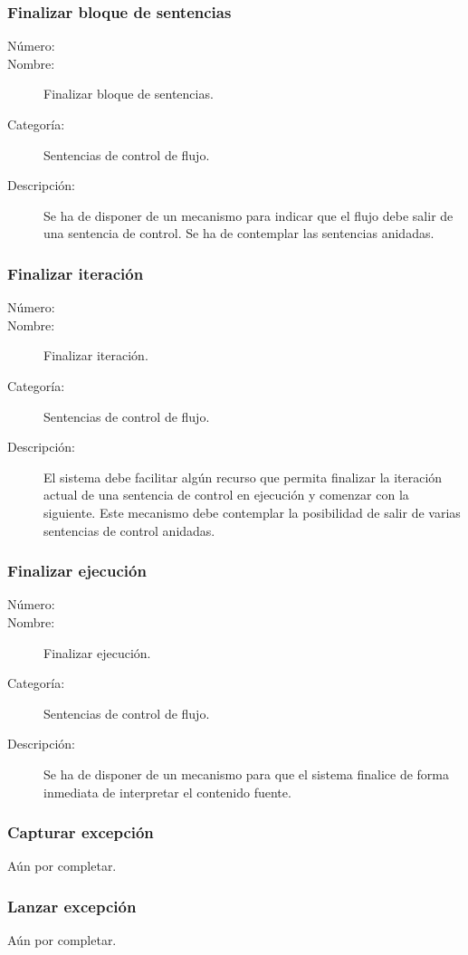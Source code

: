 \subsubsection{Finalizar bloque de sentencias}
\begin{framed}
	\begin{description}
		\item [Número:] \cn
		\item [Nombre:] Finalizar bloque de sentencias.
		\item [Categoría:] Sentencias de control de flujo.
		\item [Descripción:] Se ha de disponer de un mecanismo para indicar que el flujo debe salir de una sentencia de control. Se ha de contemplar
		las sentencias anidadas.
	\end {description}
\end{framed}



\subsubsection{Finalizar iteración}
\begin{framed}
	\begin{description}
		\item [Número:] \cn
		\item [Nombre:] Finalizar iteración.
		\item [Categoría:] Sentencias de control de flujo.
		\item [Descripción:] El sistema debe facilitar algún recurso que permita finalizar la iteración actual
		de una sentencia de control en ejecución y comenzar con la siguiente. Este
		mecanismo debe contemplar la posibilidad de salir de varias sentencias de control anidadas.
	\end {description}
\end{framed}

\subsubsection{Finalizar ejecución}
\begin{framed}
	\begin{description}
		\item [Número:] \cn
		\item [Nombre:] Finalizar ejecución.
		\item [Categoría:] Sentencias de control de flujo.
		\item [Descripción:] Se ha de disponer de un mecanismo para que el sistema finalice de forma inmediata de
		interpretar el contenido fuente.
	\end {description}
\end{framed}

\subsubsection{Capturar excepción}

Aún por completar.

\subsubsection{Lanzar excepción}

Aún por completar.
